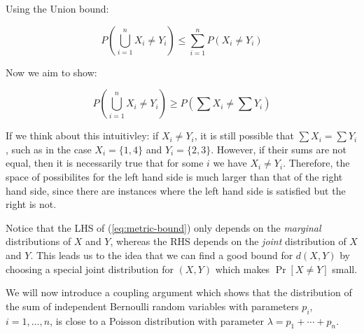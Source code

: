 \documentclass[11pt]{article}
\begin{document}
\begin{Parts}
    \begin{solution}
        Using the Union bound: 

        \[ P\left( \bigcup_{i = 1}^n X_i \neq Y_i \right) \le \sum_{i = 1}^{n}P(X_i \neq Y_i)\] 

        Now we aim to show: 

        \[ P\left( \bigcup_{i = 1}^n X_i \neq Y_i \right) \ge P\left( \sum X_i \neq \sum Y_i \right)\] 

        If we think about this intuitivley: if $X_i \neq Y_i$, it is still possible that $\sum X_i = \sum Y_i$, such as in the case $X_i = \{1, 4\}$ and $Y_i = \{2, 3\}$. However, if their sums are not equal, then it is necessarily true that for some $i$ we have $X_i \neq Y_i$. Therefore, the space of possibilites for the left hand side is much larger than that of the right hand side, since there are instances where the left hand side is satisfied but the right is not.
    \end{solution}
\end{Parts}

Notice that the LHS of (\ref{eq:metric-bound}) only depends on the \textit{marginal} distributions of $X$ and $Y$, whereas the RHS depends on the \textit{joint} distribution of $X$ and $Y$.
This leads us to the idea that we can find a good bound for $d(X, Y)$ by choosing a special joint distribution for $(X, Y)$ which makes $\Pr[X \ne Y]$ small.

We will now introduce a coupling argument which shows that the distribution of the sum of independent Bernoulli random variables with parameters $p_i$, $i = 1, \dotsc, n$, is close to a Poisson distribution with parameter $\lambda = p_1 + \cdots + p_n$.
\end{document}
